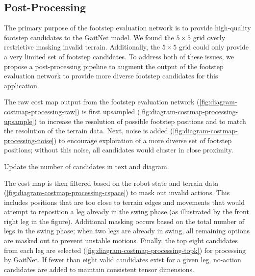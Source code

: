 \subsection{Post-Processing}
\label{subsec:methodology-contactnet-post-processing}

The primary purpose of the footstep evaluation network is to provide
high-quality footstep candidates to the GaitNet model. We found the
$5\times 5$ grid overly restrictive masking invalid terrain.
Additionally, the $5\times 5$ grid could only provide a very limited
set of footstep candidates. To address both of these issues, we
propose a post-processing pipeline to augment the output of the
footstep evaluation network to provide more diverse footstep
candidates for this application.

The raw cost map output from the footstep evaluation network
(\autoref{fig:diagram-costmap-processing-raw}) is first upsampled
(\autoref{fig:diagram-costmap-processing-upsample}) to increase the
resolution of possible footstep positions and to match the resolution
of the terrain data. Next, noise is added
(\autoref{fig:diagram-costmap-processing-noise}) to encourage
exploration of a more diverse set of footstep positions; without this
noise, all candidates would cluster in close proximity.

\begin{todo}
  Update the number of candidates in text and diagram.
\end{todo}

The cost map is then filtered based on the robot state and terrain
data (\autoref{fig:diagram-costmap-processing-cspace}) to mask out
invalid actions. This includes positions that are too close to
terrain edges and movements that would attempt to reposition a leg
already in the swing phase (as illustrated by the front right leg in
the figure). Additional masking occurs based on the total number of
legs in the swing phase; when two legs are already in swing, all
remaining options are masked out to prevent unstable motions.
Finally, the top eight candidates from each leg are selected
(\autoref{fig:diagram-costmap-processing-topk}) for processing by
GaitNet. If fewer than eight valid candidates exist for a given leg,
no-action candidates are added to maintain consistent tensor dimensions.

\def\imgwidth{0.16\textwidth}
\def\xgap{2em}          %
\def\arrowwidth{1.2em}  %
\def\arrowshift{0.5em} %

